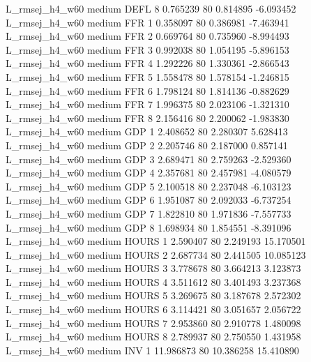 L_rmsej_h4_w60     medium     DEFL                 8  0.765239 80       0.814895          -6.093452
L_rmsej_h4_w60     medium      FFR                 1  0.358097 80       0.386981          -7.463941
L_rmsej_h4_w60     medium      FFR                 2  0.669764 80       0.735960          -8.994493
L_rmsej_h4_w60     medium      FFR                 3  0.992038 80       1.054195          -5.896153
L_rmsej_h4_w60     medium      FFR                 4  1.292226 80       1.330361          -2.866543
L_rmsej_h4_w60     medium      FFR                 5  1.558478 80       1.578154          -1.246815
L_rmsej_h4_w60     medium      FFR                 6  1.798124 80       1.814136          -0.882629
L_rmsej_h4_w60     medium      FFR                 7  1.996375 80       2.023106          -1.321310
L_rmsej_h4_w60     medium      FFR                 8  2.156416 80       2.200062          -1.983830
L_rmsej_h4_w60     medium      GDP                 1  2.408652 80       2.280307           5.628413
L_rmsej_h4_w60     medium      GDP                 2  2.205746 80       2.187000           0.857141
L_rmsej_h4_w60     medium      GDP                 3  2.689471 80       2.759263          -2.529360
L_rmsej_h4_w60     medium      GDP                 4  2.357681 80       2.457981          -4.080579
L_rmsej_h4_w60     medium      GDP                 5  2.100518 80       2.237048          -6.103123
L_rmsej_h4_w60     medium      GDP                 6  1.951087 80       2.092033          -6.737254
L_rmsej_h4_w60     medium      GDP                 7  1.822810 80       1.971836          -7.557733
L_rmsej_h4_w60     medium      GDP                 8  1.698934 80       1.854551          -8.391096
L_rmsej_h4_w60     medium    HOURS                 1  2.590407 80       2.249193          15.170501
L_rmsej_h4_w60     medium    HOURS                 2  2.687734 80       2.441505          10.085123
L_rmsej_h4_w60     medium    HOURS                 3  3.778678 80       3.664213           3.123873
L_rmsej_h4_w60     medium    HOURS                 4  3.511612 80       3.401493           3.237368
L_rmsej_h4_w60     medium    HOURS                 5  3.269675 80       3.187678           2.572302
L_rmsej_h4_w60     medium    HOURS                 6  3.114421 80       3.051657           2.056722
L_rmsej_h4_w60     medium    HOURS                 7  2.953860 80       2.910778           1.480098
L_rmsej_h4_w60     medium    HOURS                 8  2.789937 80       2.750550           1.431958
L_rmsej_h4_w60     medium      INV                 1 11.986873 80      10.386258          15.410890
